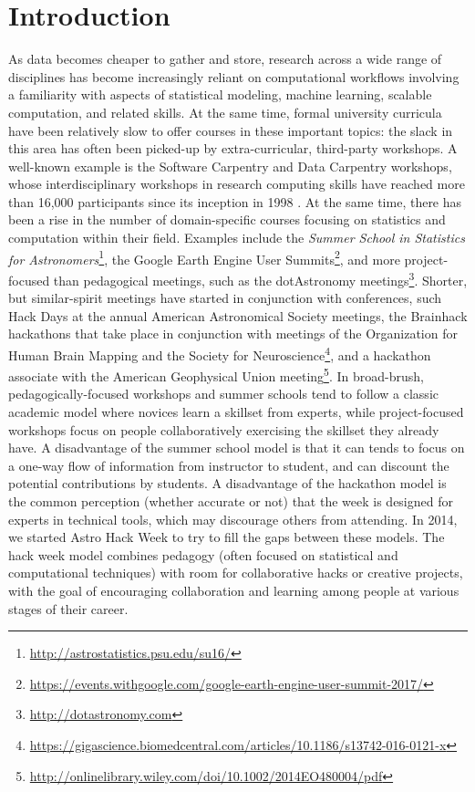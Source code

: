 \section*{Introduction}
\label{sec:introduction}

As data becomes cheaper to gather and store, research across a wide range of disciplines has become increasingly reliant on computational workflows involving a familiarity with aspects of statistical modeling, machine learning, scalable computation, and related skills.
At the same time, formal university curricula have been relatively slow to offer courses in these important topics: the slack in this area has often been picked-up by extra-curricular, third-party workshops.
A well-known example is the Software Carpentry and Data Carpentry workshops, whose interdisciplinary workshops in research computing skills have reached more than 16,000 participants since its inception in 1998 \cite{b:wilson-swc-lessons-2016,teal2015data}.
At the same time, there has been a rise in the number of domain-specific courses focusing on statistics and computation within their field.
Examples include the \textit{Summer School in Statistics for Astronomers}\footnote{\url{http://astrostatistics.psu.edu/su16/}}, the Google Earth Engine User Summits\footnote{\url{https://events.withgoogle.com/google-earth-engine-user-summit-2017/}}, and more project-focused than pedagogical meetings, such as the dotAstronomy meetings\footnote{\url{http://dotastronomy.com}}.
Shorter, but similar-spirit meetings have started in conjunction with conferences, such Hack Days at the annual American Astronomical Society meetings, the Brainhack hackathons that take place in conjunction with meetings of the Organization for Human Brain Mapping and the Society for Neuroscience\footnote{\url{https://gigascience.biomedcentral.com/articles/10.1186/s13742-016-0121-x}}, and a hackathon associate with the American Geophysical Union meeting\footnote{\url{http://onlinelibrary.wiley.com/doi/10.1002/2014EO480004/pdf}}.
In broad-brush, pedagogically-focused workshops and summer schools tend to follow a classic academic model where novices learn a skillset from experts, while project-focused workshops focus on people collaboratively exercising the skillset they already have.
A disadvantage of the summer school model is that it can tends to focus on a one-way flow of information from instructor to student, and can discount the potential contributions by students.
A disadvantage of the hackathon model is the common perception (whether accurate or not) that the week is designed for experts in technical tools, which may discourage others from attending.
In 2014, we started Astro Hack Week to try to fill the gaps between these models.
The hack week model combines pedagogy (often focused on statistical and computational techniques) with room for collaborative hacks or creative projects, with the goal of encouraging collaboration and learning among people at various stages of their career.

